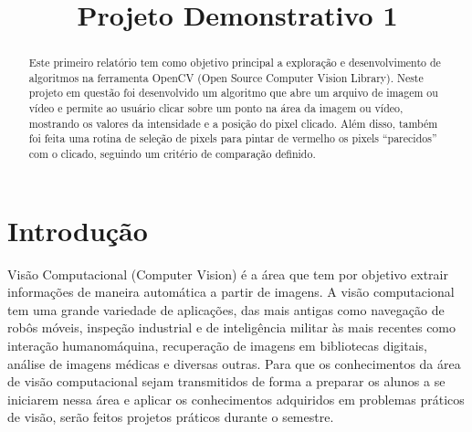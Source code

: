 \documentclass{bmvc2k}
\title{Projeto Demonstrativo 1}
\begin{document}
\maketitle

\begin{abstract}
Este primeiro relatório tem como objetivo principal a exploração e desenvolvimento de algoritmos na ferramenta OpenCV (Open Source Computer Vision Library). Neste projeto em questão foi desenvolvido um algoritmo que abre um arquivo de imagem ou vídeo e permite ao usuário clicar sobre um ponto na área da imagem ou vídeo, mostrando os valores da intensidade e a posição do pixel clicado. Além disso, também foi feita uma rotina de seleção de pixels para pintar de vermelho os pixels ``parecidos'' com o clicado, seguindo um critério de comparação definido. 
\end{abstract}

\section{Introdução}
\label{sec:intro}
Visão Computacional (Computer Vision) é a área que tem por objetivo extrair informações de maneira automática a partir de imagens. A visão computacional tem uma grande variedade de aplicações, das mais antigas como navegação de robôs móveis, inspeção industrial e de inteligência militar às mais recentes como interação humanomáquina, recuperação de imagens em bibliotecas digitais, análise de imagens médicas e diversas outras. Para que os conhecimentos da área de visão computacional sejam transmitidos de forma a preparar os alunos a se iniciarem nessa área e aplicar os conhecimentos adquiridos em problemas práticos de visão, serão feitos projetos práticos durante o semestre.
\end{document}
